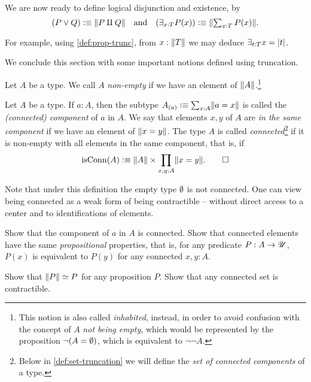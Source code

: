 We are now ready to define logical disjunction and existence, by
\[
(P \vee Q) \defeq \Trunc{P \amalg Q} \quad\text{and}
\quad\textstyle (\exists_{x:T} P(x)) \defeq \Trunc*{\sum_{x:T}P(x)}.
\]

For example, using \cref{def:prop-trunc},
from $x:\lVert T\rVert$ we may deduce $\exists_{t:T} x=\lvert t\rvert$.

We conclude this section with some important notions defined using truncation.

\begin{definition}\label{def:non-empty}
  Let $A$ be a type.
  We call $A$ \emph{non-empty}
  if we have an element of $\lVert A\rVert$.\footnote{%
    This notion is also called \emph{inhabited},
    instead, in order to avoid confusion with the
    concept of $A$ \emph{not being empty},
    which would be represented by the proposition
    $\neg(A = \emptyset)$, which is equivalent to
    $\neg\neg A$.}
\end{definition}

\begin{definition}\label{def:connected}
  Let $A$ be a type. If $a:A$, then the subtype $A_{(a)}\defeq \sum_{x:A}\Trunc{a=x}$
  is called the \emph{(connected) component} of $a$ in $A$.
  We say that elements $x,y$ of $A$ are \emph{in the same component}
  if we have an element of $\lVert x=y\rVert$.
  The type $A$ is called \emph{connected}\footnote{%
    Below in \cref{def:set-truncation} we will
    define the \emph{set of connected components} of a type.}
  if it is non-empty with
  all elements in the same component, that is, if
  \[
    \isconn(A) \defeq \Trunc{A} \times \prod_{x,y:A} \Trunc{x=y}.\qedhere
  \]
\end{definition}
Note that under this definition the empty type $\emptyset$ is not connected.
One can view being connected as a weak form
of being contractible -- without direct access to a center and to
identifications of elements.

\begin{xca}\label{xca:component-connected}
Show that the component of $a$ in $A$ is connected.
Show that connected elements have the same
\emph{propositional} properties, that is,
for any predicate $P:A\to{\mathscr{U}}$, $P(x)$ is equivalent
to $P(y)$ for any connected $x,y:A$.
\end{xca}

\begin{xca}\label{xca:prop-set-trivia}
Show that $\lVert P\rVert \simeq P$ for any proposition $P$.
Show that any connected set is contractible.
\end{xca}

